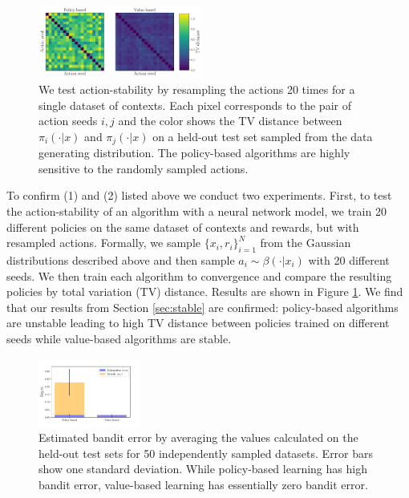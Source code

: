 \begin{figure}[h]
    \centering
    \includegraphics[width=0.48\textwidth]{figures/offline-bandits/toy_stability.pdf}
    \caption{We test action-stability by resampling the actions 20 times for a single dataset of contexts. Each pixel corresponds to the pair of action seeds $ i,j $ and the color shows the TV distance between $ \pi_i(\cdot|x)$ and $ \pi_j(\cdot|x) $ on a held-out test set sampled from the data generating distribution. The policy-based algorithms are highly sensitive to the randomly sampled actions.}
    \label{fig:toy_stability}
\end{figure}


To confirm (1) and (2) listed above we conduct two experiments. First, to test the action-stability of an algorithm with a neural network model, we train 20 different policies on the same dataset of contexts and rewards, but with resampled actions. Formally, we sample $ \{x_i, r_i\}_{i=1}^N$ from the Gaussian distributions described above and then sample $ a_i \sim \beta(\cdot|x_i)$ with 20 different seeds. We then train each algorithm to convergence and compare the resulting policies by total variation (TV) distance. Results are shown in Figure \ref{fig:toy_stability}. We find that our results from Section \ref{sec:stable} are confirmed: policy-based algorithms are unstable leading to high TV distance between policies trained on different seeds while value-based algorithms are stable.


\begin{figure}
    \centering
    \includegraphics[width=0.3\textwidth]{figures/offline-bandits/toy_regret_bar.pdf}
    \caption{Estimated bandit error by averaging the values calculated on the held-out test sets for 50 independently sampled datasets. Error bars show one standard deviation. While policy-based learning has high bandit error, value-based learning has essentially zero bandit error.}
    \label{fig:toy_regret}
\end{figure}


